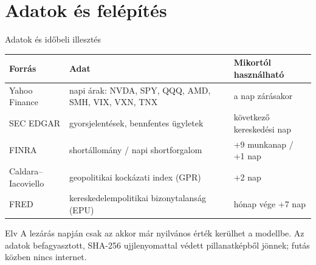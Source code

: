 \documentclass[aspectratio=169,11pt]{beamer}
\begin{document}
\section{Adatok és felépítés}
\begin{frame}{Adatok és időbeli illesztés}
  \centering\small
  \renewcommand{\arraystretch}{1.2}
  \begin{tabular}{@{}L{.2\linewidth}L{.47\linewidth}L{.27\linewidth}@{}}
    \toprule
    \textbf{Forrás} & \textbf{Adat} & \textbf{Mikortól használható}\\
    \midrule
    Yahoo Finance & napi árak: NVDA, SPY, QQQ, AMD, SMH, VIX, VXN, TNX & a nap zárásakor\\
    SEC EDGAR & gyorsjelentések, bennfentes ügyletek & következő kereskedési nap\\
    FINRA & shortállomány / napi shortforgalom & +9 munkanap / +1 nap\\
    Caldara--Iacoviello & geopolitikai kockázati index (GPR) & +2 nap\\
    FRED & kereskedelempolitikai bizonytalanság (EPU) & hónap vége +7 nap\\
    \bottomrule
  \end{tabular}
  \par\medskip\raggedright
  \begin{block}{Elv}
    A lezárás napján csak az akkor már nyilvános érték kerülhet a modellbe.
    Az adatok befagyasztott, SHA-256 ujjlenyomattal védett pillanatképből
    jönnek; futás közben nincs internet.
  \end{block}
\end{frame}
\end{document}

